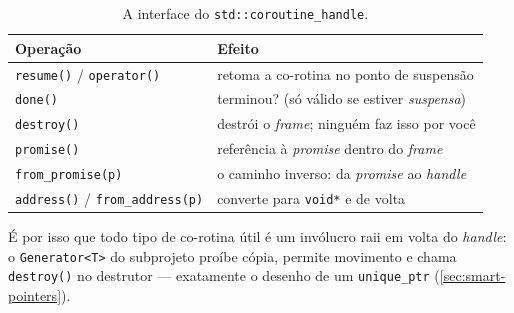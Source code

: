\begin{table}[htbp]
\centering
\caption{A interface do \texttt{std::coroutine\_handle}.}
\label{tab:coroutine-handle}
\footnotesize
\begin{tabular}{@{}ll@{}}
\toprule
\textbf{Operação} & \textbf{Efeito} \\
\midrule
\texttt{resume()} / \texttt{operator()} & retoma a co-rotina no ponto de suspensão \\
\texttt{done()}                         & terminou? (só válido se estiver \emph{suspensa}) \\
\texttt{destroy()}                      & destrói o \emph{frame}; ninguém faz isso por você \\
\texttt{promise()}                      & referência à \emph{promise} dentro do \emph{frame} \\
\texttt{from\_promise(p)}               & o caminho inverso: da \emph{promise} ao \emph{handle} \\
\texttt{address()} / \texttt{from\_address(p)} & converte para \texttt{void*} e de volta \\
\bottomrule
\end{tabular}
\end{table}

É por isso que todo tipo de co-rotina útil é um invólucro \gls{raii} em volta do
\emph{handle}: o \texttt{Generator<T>} do subprojeto proíbe cópia, permite
movimento e chama \texttt{destroy()} no destrutor --- exatamente o desenho de um
\texttt{unique\_ptr} (\cref{sec:smart-pointers}).

